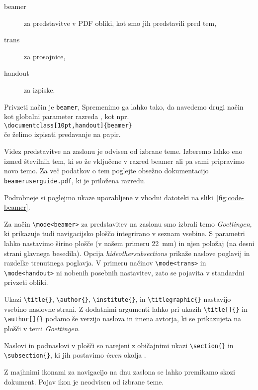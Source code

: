 \begin{description}
\item[beamer] za predstavitve v PDF obliki, kot smo jih predstavili pred tem,
\item[trans] za prosojnice,
\item[handout] za izpiske.
\end{description}
Privzeti način je \texttt{beamer}, Spremenimo ga lahko tako,
da navedemo drugi način kot globalni parameter razreda ,
kot npr.\\
\verb|\documentclass[10pt,handout]{beamer}|\\ če želimo izpisati
predavanje na papir.

Videz predstavitve na zaslonu je odvisen od izbrane teme. Izberemo lahko
eno izmed številnih tem, ki so že vključene v razred beamer ali pa sami
pripravimo novo temo. Za več podatkov o tem poglejte obsežno
dokumentacijo \texttt{beameruserguide.pdf}, ki je priložena razredu.

Podrobneje si poglejmo ukaze uporabljene v vhodni datoteki
na sliki~\ref{fig:code-beamer}.

Za način \verb|\mode<beamer>| za predstavitev na zaslonu smo izbrali temo 
\emph{Goettingen}, ki prikazuje tudi navigacijsko ploščo integrirano
v seznam vsebine. S parametri lahko nastavimo širino plošče
(v našem primeru 22~mm) in njen položaj  (na desni strani 
glavnega besedila). Opcija \emph{hideothersubsections} prikaže naslove
poglavij in razdelke trenutnega poglavja. V primeru načinov
\verb|\mode<trans>| in \verb|\mode<handout>| ni nobenih
posebnih nastavitev, zato se pojavita v standardni privzeti obliki.

Ukazi \verb|\title{}|, \verb|\author{}|, \verb|\institute{}|,
in \verb|\titlegraphic{}| nastavijo vsebino naslovne strani. Z dodatnimi
argumenti lahko pri ukazih \verb|\title[]{}| in \verb|\author[]{}|
podamo še verzijo naslova in imena avtorja, ki se prikazujeta na plošči
v temi \emph{Goettingen}.

Naslovi in podnaslovi v plošči so narejeni z običajnimi
ukazi \verb|\section{}| in \verb|\subsection{}|, ki jih postavimo
\emph{izven} okolja .

Z majhnimi ikonami za navigacijo na dnu zaslona se lahko
premikamo skozi dokument. Pojav ikon je neodvisen od izbrane teme.

